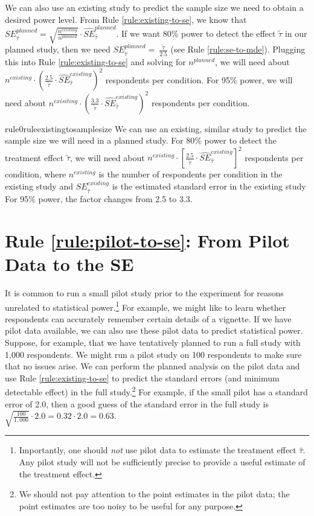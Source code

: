 \documentclass[12pt]{article}
\begin{document}
We can also use an existing study to predict the sample size we need to obtain a desired power level.
From Rule \ref{rule:existing-to-se}, we know that $SE_{\widehat{\tau}}^{planned} = \sqrt{\frac{n^{existing}}{n^{planned}}} \cdot {\widehat{SE}}_{\widehat{\tau}}^{planned}$.
If we want 80\% power to detect the effect $\widetilde{\tau}$ in our planned study, then we need $SE_{\widehat{\tau}}^{planned} = \ \frac{\widetilde{\tau}}{2.5}$ (see
Rule \ref{rule:se-to-mde}). Plugging this into Rule \ref{rule:existing-to-se} and solving for $n^{planned}$, we will need about $n^{existing} \cdot \left( \frac{2.5}{\widetilde{\tau}} \cdot {\widehat{SE}}_{\widehat{\tau}}^{existing} \right)^{2}$ respondents per condition. 
For 95\% power, we will need about $n^{exisiting} \cdot \left( \frac{3.3}{\widetilde{\tau}} \cdot {\widehat{SE}}_{\widehat{\tau}}^{existing} \right)^{2}$ respondents per condition.

\begin{restatable}{rule0}{ruleexistingtosamplesize}
\label{rule:existing-to-sample-size}
We can use an existing, similar study to predict the sample size we will need in a planned study. For 80\% power to detect the treatment effect $\widetilde{\tau}$, we will need about $n^{existing} \cdot \left\lbrack \frac{2.5}{\widetilde{\tau}} \cdot {\widehat{SE}}_{\widehat{\tau}}^{existing} \right\rbrack^{2}$ respondents per condition, where $n^{existing}$ is the number of respondents per condition in the existing study and $SE_{\widehat{\tau}}^{existing}$ is the estimated standard error in the existing study
For 95\% power, the factor changes from 2.5 to 3.3.
\end{restatable}

\section*{Rule \ref{rule:pilot-to-se}: From Pilot Data to the SE}

It is common to run a small pilot study prior to the experiment for reasons unrelated to statistical power.\footnote{
  Importantly, one should \textit{not} use pilot data to estimate the treatment effect $\widehat{\tau}$. 
  Any pilot study will not be sufficiently precise to provide a useful estimate of the treatment effect.
  }
For example, we might like to learn whether respondents can accurately remember certain details of a vignette. 
If we have pilot data available, we can also use these pilot data to predict statistical power. 
Suppose, for example, that we have tentatively planned to run a full study with 1,000 respondents. 
We might run a pilot study on 100 respondents to make sure that no issues arise. 
We can perform the planned analysis on the pilot data and use Rule \ref{rule:existing-to-se} to predict the standard errors (and minimum detectable
effect) in the full study.\footnote{We should not pay attention to the
point estimates in the pilot data; the point estimates are too noisy to
be useful for any purpose.} 
For example, if the small pilot has a standard error of 2.0, then a good guess of the standard error in the full study is $\sqrt{\frac{100}{1,000}} \cdot 2.0 = 0.32 \cdot 2.0 = 0.63$.
\end{document}
